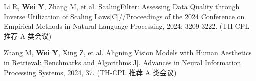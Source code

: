 \begin{resume}
\begin{achievements}
    \item Li R, \textbf{Wei Y}, Zhang M, et al. ScalingFilter: Assessing Data Quality through Inverse Utilization of Scaling Laws[C]//Proceedings of the 2024 Conference on Empirical Methods in Natural Language Processing, 2024: 3209-3222. (TH-CPL 推荐 A 类会议)
    \item Zhang M, \textbf{Wei Y}, Xing Z, et al. Aligning Vision Models with Human Aesthetics in Retrieval: Benchmarks and Algorithms[J]. Advances in Neural Information Processing Systems, 2024, 37. (TH-CPL 推荐 A 类会议)  %

    

\end{achievements}
\end{resume}
